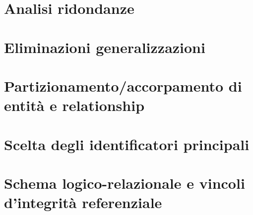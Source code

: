 \section{Analisi ridondanze}
	
	
\section{Eliminazioni generalizzazioni}


\section{Partizionamento/accorpamento di entità e relationship}


\section{Scelta degli identificatori principali}


\section{Schema logico-relazionale e vincoli d'integrità referenziale}
